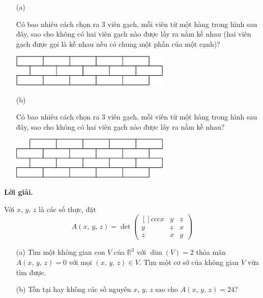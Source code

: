\begin{tcolorbox}[title=\textbf{Bài toán B.4.},breakable]
    \begin{enumerate}
        \item[(a)] {Có bao nhiêu cách chọn ra 3 viên gạch, mỗi viên từ một hàng trong hình sau đây, sao cho không có hai viên gạch nào được lấy ra nằm kề nhau (hai viên gạch được gọi là kề nhau nếu có chung một phần của một cạnh)?
        
        \begin{center}
            \includegraphics[width=0.6\textwidth]{Figures/02.png}
        \end{center}}
        \item[(b)] {Có bao nhiêu cách chọn ra 3 viên gạch, mỗi viên từ một hàng trong hình sau đây, sao cho không có hai viên gạch nào được lấy ra nằm kề nhau?
        
        \begin{center}
            \includegraphics[width=0.6\textwidth]{Figures/03.png}
        \end{center}}
    \end{enumerate}
\end{tcolorbox}

\textbf{Lời giải. }

\begin{tcolorbox}[title=\textbf{Bài toán B.5.},breakable]
    Với $x,\,y,\,z$ là các số thực, đặt 
    $$A(x,\,y,\,z) = \det \begin{pmatrix}[]{ccc}
        x & y & z \\
        y & z & x \\
        z & x & y
    \end{pmatrix}$$
    \begin{enumerate}
        \item[(a)] {Tìm một không gian con $V$ của $\mathbb{R}^3$ với $\dim (V) = 2$ thỏa mãn $A(x,\,y,\,z)=0$ với mọi $(x,\,y,\,z) \in V$. Tìm một cơ sở của không gian $V$ vừa tìm được.}
        \item[(b)] {Tồn tại hay không các số nguyên $x,\,y,\,z$ sao cho $A(x,\,y,\,z) = 24$?}
    \end{enumerate}
\end{tcolorbox}

